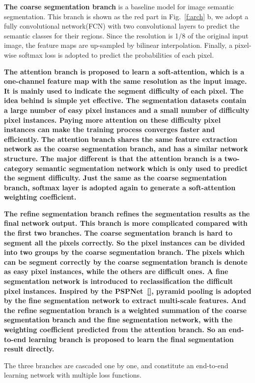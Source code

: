 \documentclass[10.5pt,compsoc]{TsT}
\theoremstyle{mystyle}
\begin{document}
{\textbf{The coarse segmentation branch} is a baseline model for image semantic segmentation.
This branch is shown as the red part in Fig.~\ref{f:arch} b, we adopt a fully convolutional network(FCN) with two convolutional layers to predict the semantic classes for their regions.
Since the resolution is 1/8 of the original input image, the feature maps are up-sampled by bilinear interpolation.
Finally, a pixel-wise softmax loss is adopted to predict the probabilities of each pixel.


\bf{The attention branch} is proposed to learn a soft-attention, which is a one-channel feature map with the same resolution as the input image. 
It is mainly used to indicate the segment difficulty of each pixel.
The idea behind is simple yet effective. 
The segmentation datasets contain a large number of easy pixel instances and a small number of difficulty pixel instances.
Paying more attention on these difficulty pixel instances can make the training process converges faster and efficiently.
The attention branch shares the same feature extraction network as the coarse segmentation branch, and has a similar network structure.
The major different is that the attention branch is a two-category semantic segmentation network which is only used to predict the segment difficulty.
Just the same as the coarse segmentation branch, softmax layer is adopted again to generate a soft-attention weighting coefficient.


\bf{The refine segmentation branch} refines the segmentation results as the final network output.
This branch is more complicated compared with the first two branches.
The coarse segmentation branch is hard to segment all the pixels correctly.
So the pixel instances can be divided into two groups by the coarse segmentation branch.
The pixels which can be segment correctly by the coarse segmentation branch is denote as easy pixel instances, while the others are difficult ones.
A fine segmentation network is introduced to reclassification the difficult pixel instances.
Inspired by the PSPNet~\ref{}, pyramid pooling is adopted by the fine segmentation network to extract multi-scale features.
And the refine segmentation branch is a weighted summation of the coarse segmentation branch and the fine segmentation network, with the weighting coefficient predicted from the attention branch.
So an end-to-end learning branch is proposed to learn the final segmentation result directly.

The three branches are cascaded one by one, and constitute an end-to-end learning network with multiple loss functions.

}
\end{document}
